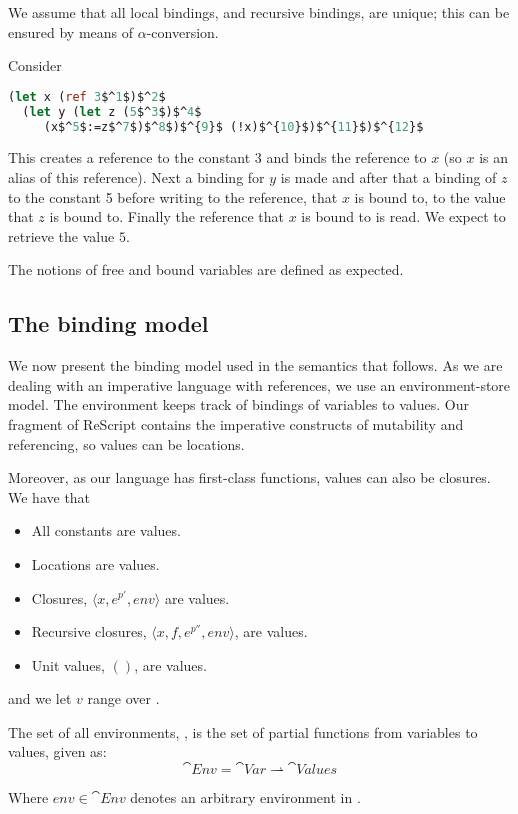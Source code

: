 \documentclass[acmsmall,sigplan]{acmart}
\begin{document}
We assume that all local bindings, and recursive bindings, are unique;
this can be ensured by means of $\alpha$-conversion.

\begin{example}[]\label{ex:write}
Consider
\begin{lstlisting}[language=Caml, mathescape=true]
  (let x (ref 3$^1$)$^2$
  (let y (let z (5$^3$)$^4$
     (x$^5$:=z$^7$)$^8$)$^{9}$ (!x)$^{10}$)$^{11}$)$^{12}$
\end{lstlisting}
This creates a reference to the constant 3 and binds the reference to
$x$ (so $x$ is an alias of this reference). Next a binding for $y$ is
made and after that a binding of $z$ to the constant 5 before writing
to the reference, that $x$ is bound to, to the value that $z$ is bound
to.  Finally the reference that $x$ is bound to is read. We expect to
retrieve the value $5$.
\end{example}

The notions of free and bound variables are defined as expected.

\subsection{The binding model}\label{sec:EnvSto}

We now present the binding model used in the semantics that
follows. As we are dealing with an imperative language with
references, we use an environment-store model. The environment keeps
track of bindings of variables to values. Our fragment of ReScript
contains the imperative constructs of mutability and referencing, so
values can be locations.

Moreover, as our language has first-class functions, values can also be closures.
We have that
\begin{itemize}
	\item All constants are values.
	\item Locations are values.
	\item Closures, $\langle x,e^{p'},env\rangle$ are values.
	\item Recursive closures, $\langle x,f,e^{p''},env\rangle$, are values.
	\item Unit values, $()$, are values.
\end{itemize}

and we let $v$ range over .

\begin{definition}
	The set of all environments, , is the set of partial functions from variables to values, given as:
	$$\cat{Env}=\cat{Var}\rightharpoonup\cat{Values}$$
\end{definition}
Where $env\in\cat{Env}$ denotes an arbitrary environment in .
\end{document}
